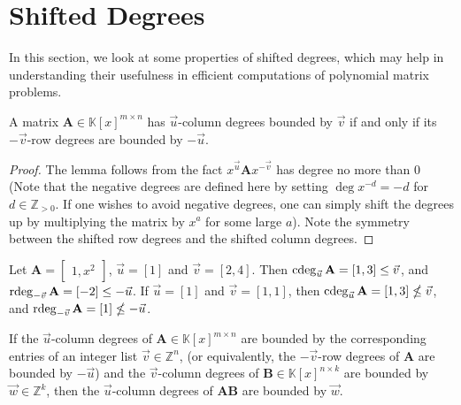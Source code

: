 \section{Shifted Degrees}

In this section, we look at some properties of shifted degrees, which
may help in understanding their usefulness in efficient computations
of polynomial matrix problems.


\begin{lem}
\label{lem:columnDegreesRowDegreesSymmetry}A matrix $\mathbf{A}\in\mathbb{K}\left[x\right]^{m\times n}$
has $\vec{u}$-column degrees bounded by $\vec{v}$ if and only if
its $-\vec{v}$-row degrees are bounded by $-\vec{u}$. %
\begin{comment}
In addition, for a matrix $\mathbf{A}$ with $\vec{u}$-column degrees
$\vec{v}$, it has a full-rank leading $\vec{u}$-column coefficient
matrix if and only if it has a full-rank leading $-\vec{v}$-row coefficient
matrix.
\end{comment}
\end{lem}
\begin{proof}
The lemma follows from the fact $x^{\vec{u}}\mathbf{A}x^{-\vec{v}}$
has degree no more than 0 (Note that the negative degrees are defined
here by setting $\deg x^{-d}=-d$ for $d\in\mathbb{Z}_{>0}$. If one
wishes to avoid negative degrees, one can simply shift the degrees
up by multiplying the matrix by $x^{a}$ for some large $a$). Note
the symmetry between the shifted row degrees and the shifted column
degrees.\end{proof}
\begin{example}
Let $\mathbf{A}=\begin{bmatrix}1,x^{2}\end{bmatrix}$, $\vec{u}=\left[1\right]$
and $\vec{v}=\left[2,4\right]$. Then $\cdeg_{\vec{u}}\mathbf{A}=\left[1,3\right]\le\vec{v}$,
and $\rdeg_{-\vec{v}}\mathbf{A}=\left[-2\right]\le-\vec{u}$. If $\vec{u}=\left[1\right]$
and $\vec{v}=[1,1]$, then $\cdeg_{\vec{u}}\mathbf{A}=\left[1,3\right]\nleq\vec{v}$,
and $\rdeg_{-\vec{v}}\mathbf{A}=\left[1\right]\nleq-\vec{u}$.\end{example}
\begin{lem}
\label{lem:productDegreeBound}If the $\vec{u}$-column degrees of
$\mathbf{A}\in\mathbb{K}\left[x\right]^{m\times n}$ are bounded by
the corresponding entries of an integer list $\vec{v}\in\mathbb{Z}^{n}$,
(or equivalently, the $-\vec{v}$-row degrees of $\mathbf{A}$ are
bounded by $-\vec{u}$) and the $\vec{v}$-column degrees of $\mathbf{B}\in\mathbb{K}\left[x\right]^{n\times k}$
are bounded by $\vec{w}\in\mathbb{Z}^{k}$, then the $\vec{u}$-column
degrees of $\mathbf{A}\mathbf{B}$ are bounded by $\vec{w}$. \end{lem}
